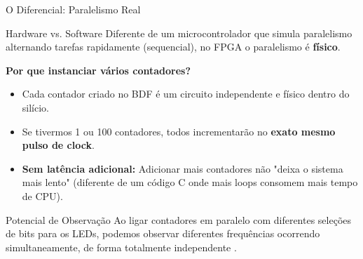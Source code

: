 \documentclass[aspectratio=169]{beamer}
\begin{document}
\begin{frame}{O Diferencial: Paralelismo Real}
	\begin{block}{Hardware vs. Software}
		Diferente de um microcontrolador que simula paralelismo alternando tarefas rapidamente (sequencial), no FPGA o paralelismo é \textbf{físico}.
	\end{block}
	
	\textbf{Por que instanciar vários contadores?}
	\begin{itemize}
		\item Cada contador criado no BDF é um circuito independente e físico dentro do silício.
		\item Se tivermos 1 ou 100 contadores, todos incrementarão no \textbf{exato mesmo pulso de clock}.
		\item \textbf{Sem latência adicional:} Adicionar mais contadores não "deixa o sistema mais lento" (diferente de um código C onde mais loops consomem mais tempo de CPU).
	\end{itemize}
	
	\begin{alertblock}{Potencial de Observação}
		Ao ligar contadores em paralelo com diferentes seleções de bits para os LEDs, podemos observar diferentes frequências ocorrendo simultaneamente, de forma totalmente independente .
	\end{alertblock}
\end{frame}
\end{document}
